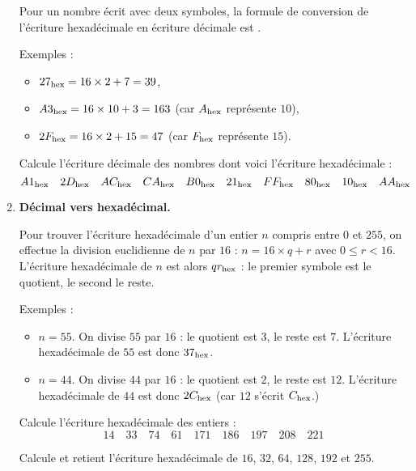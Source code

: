 \documentclass[class=report,crop=false, 12pt]{standalone}
\begin{document}
\begin{activite}[Hexadécimal]
\begin{enumerate}
  Pour un nombre écrit avec deux symboles, la formule de conversion de l'écriture hexadécimale en écriture décimale est .
  
  
  Exemples :
  \begin{itemize}
    \item $27_{\text{hex}} = 16 \times 2 + 7 =  39$,
    
    \item $A3_{\text{hex}} = 16 \times 10 + 3 = 163$ (car $A_{\text{hex}}$ représente $10$),
    
    \item $2F_{\text{hex}} = 16 \times 2 + 15 = 47$ (car $F_{\text{hex}}$ représente $15$).
  \end{itemize}
 
 \bigskip
  
  Calcule l'écriture décimale des nombres dont voici l'écriture hexadécimale :
  $$A1_{\text{hex}} \quad 2D_{\text{hex}} \quad  AC_{\text{hex}} \quad  CA_{\text{hex}} \quad  B0_{\text{hex}} \quad  21_{\text{hex}} \quad  
  FF_{\text{hex}} \quad  80_{\text{hex}} \quad  10_{\text{hex}} \quad  AA_{\text{hex}}$$ 
  
  \item \textbf{Décimal vers hexadécimal.}
  
  Pour trouver l'écriture hexadécimale d'un entier $n$ compris entre $0$ et $255$, on effectue la division euclidienne de 
  $n$ par $16$ : $n = 16 \times q + r$ avec $0 \le r<16$. L'écriture hexadécimale de $n$ est alors $qr_{\text{hex}}$ : le premier symbole est le quotient, le second le reste.
  
   Exemples :
   \begin{itemize}
     \item $n=55$. On divise $55$ par $16$ : le quotient est $3$, le reste est $7$. L'écriture hexadécimale de $55$ est donc $37_{\text{hex}}$.
     
     \item $n=44$. On divise $44$ par $16$ : le quotient est $2$, le reste est $12$. L'écriture hexadécimale de $44$ est donc $2C_{\text{hex}}$ (car $12$ s'écrit $C_{\text{hex}}$.)         
   \end{itemize}   
   
 
 \bigskip
  Calcule l'écriture hexadécimale des entiers :  
  $$14 \quad 33 \quad 74 \quad 61 \quad 171 \quad 186 \quad 197 \quad 208 \quad 221$$
  
  Calcule et retient l'écriture hexadécimale de $16$, $32$, $64$, $128$, $192$ et $255$.
\end{enumerate}

\end{activite}
\end{document}
